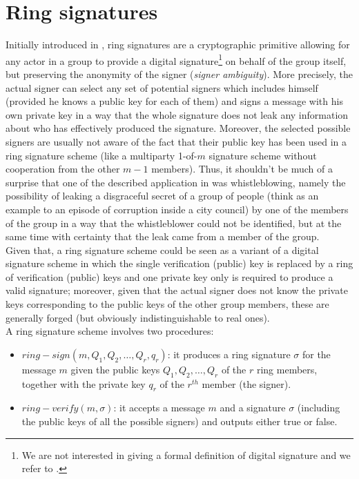 \section{Ring signatures}
\label{ring_signatures}
Initially introduced in \cite{LeakSecret}, ring signatures are a cryptographic primitive allowing for any actor in a group to provide a digital signature\footnote{We are not interested in giving a formal definition of digital signature and we refer to \cite{UnderstandingCrypto}.} on behalf of the group itself, but preserving the anonymity of the signer (\textit{signer ambiguity}). More precisely, the actual signer can select any set of potential signers which includes himself (provided he knows a public key for each of them) and signs a message with his own private key in a way that the whole signature does not leak any information about who has effectively produced the signature. Moreover, the selected possible signers are usually not aware of the fact that their public key has been used in a ring signature scheme (like a multiparty 1-of-$m$ signature scheme without cooperation from the other $m-1$ members). Thus, it shouldn't be much of a surprise that one of the described application in \cite{LeakSecret} was whistleblowing, namely the possibility of leaking a disgraceful secret of a group of people (think as an example to an episode of corruption inside a city council) by one of the members of the group in a way that the whistleblower could not be identified, but at the same time with certainty that the leak came from a member of the group.\\
Given that, a ring signature scheme could be seen as a variant of a digital signature scheme in which the single verification (public) key is replaced by a ring of verification (public) keys and one private key only is required to produce a valid signature; moreover, given that the actual signer does not know the private keys corresponding to the public keys of the other group members, these are generally forged (but obviously indistinguishable to real ones).\\
A ring signature scheme involves two procedures: \begin{itemize}
    \item $ring-sign(m, Q_1, Q_2, \dots, Q_r, q_r)$: it produces a ring signature $\sigma$ for the message $m$ given the public keys $Q_1, Q_2, \dots, Q_r$ of the $r$ ring members, together with the private key $q_r$ of the $r^{th}$ member (the signer).
    \item $ring-verify(m,\sigma)$: it accepts a message $m$ and a signature $\sigma$ (including the public keys of all the possible signers) and outputs either true or false.
\end{itemize}
